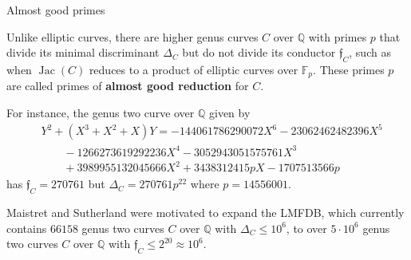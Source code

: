 \documentclass[10pt]{beamer}
\begin{document}
\begin{frame}[t]{Almost good primes}

Unlike elliptic curves, there are higher genus curves $ C $ over $ \mathbb{Q} $ with primes $ p $ that divide its minimal discriminant $ \Delta_C $ but do not divide its conductor $ \mathfrak{f}_C $, such as when $ \operatorname{Jac}(C) $ reduces to a product of elliptic curves over $ \mathbb{F}_p $. These primes $ p $ are called primes of \textbf{almost good reduction} for $ C $.

\vspace{0.5cm} For instance, the genus two curve over $ \mathbb{Q} $ given by
\begin{align*}
& Y^2 + (X^3 + X^2 + X)Y = -144061786290072X^6 - 23062462482396X^5 \\
& \qquad - 1266273619292236X^4 - 3052943051575761X^3 \\
& \qquad + 3989955132045666X^2 + 3438312415pX - 1707513566p
\end{align*}
has $ \mathfrak{f}_C = 270761 $ but $ \Delta_C = 270761p^{22} $ where $ p = 14556001 $.

\vspace{0.5cm} Maistret and Sutherland were motivated to expand the LMFDB, which currently contains $ 66158 $ genus two curves $ C $ over $ \mathbb{Q} $ with $ \Delta_C \le 10^6 $, to over $ 5 \cdot 10^6 $ genus two curves $ C $ over $ \mathbb{Q} $ with $ \mathfrak{f}_C \le 2^{20} \approx 10^6 $.

\end{frame}
\end{document}
